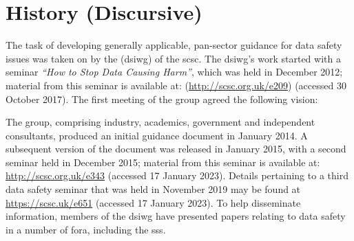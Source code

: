 %
%
\chapter{ History (Discursive)} \label{bkm:history}


The task of developing generally applicable, pan-sector guidance for data safety issues was taken on by the (\gls{dsiwg}) of the \gls{scsc}. The \gls{dsiwg}'s work started with a seminar \textit{``How to Stop Data Causing Harm''}, which was held in December 2012; material from this seminar is available at: (\href{http://scsc.org.uk/e209}{http://scsc.org.uk/e209}) (accessed 30 October 2017). The first meeting of the group agreed the following vision: 

\begin{quote}
\end{quote}

The group, comprising industry, academics, government and independent consultants,
produced an initial guidance document in January 2014.
A subsequent version of the document was released in January 2015,
with a second seminar  held in December 2015;
material from this seminar is available at: \href{http://scsc.org.uk/e343}{http://scsc.org.uk/e343} (accessed 17 January 2023).
Details pertaining to a third data safety seminar  that was held in November 2019 may be found at
\href{https://scsc.uk/e651}{https://scsc.uk/e651}
(accessed 17 January 2023).
To help disseminate information, members of the \gls{dsiwg} have presented papers relating to data safety in a number of fora,
including the \gls{sss}.

